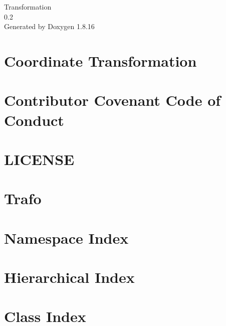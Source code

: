 \let\mypdfximage\pdfximage\def\pdfximage{\immediate\mypdfximage}\documentclass[twoside]{book}
\newcommand{\+}{\discretionary{\mbox{\scriptsize$\hookleftarrow$}}{}{}}
\newcommand{\clearemptydoublepage}{%
  \newpage{\pagestyle{empty}\cleardoublepage}%
}
\begin{document}
\hypersetup{pageanchor=false,
             bookmarksnumbered=true,
             pdfencoding=unicode
            }
\begin{titlepage}
\vspace*{7cm}
\begin{center}%
{\Large Transformation \\[1ex]\large 0.\+2 }\\
\vspace*{1cm}
{\large Generated by Doxygen 1.8.16}\\
\end{center}
\end{titlepage}
\clearemptydoublepage
{}
\tableofcontents
\clearemptydoublepage
{}
\hypersetup{pageanchor=true}

\chapter{Coordinate Transformation}
\label{index}\hypertarget{index}{}
\chapter{Contributor Covenant Code of Conduct}
\label{md__c_o_d_e__o_f__c_o_n_d_u_c_t}

\chapter{L\+I\+C\+E\+N\+SE}
\label{md__l_i_c_e_n_s_e}

\chapter{Trafo}
\label{md__r_e_a_d_m_e}

\chapter{Namespace Index}

\chapter{Hierarchical Index}

\chapter{Class Index}

\end{document}
